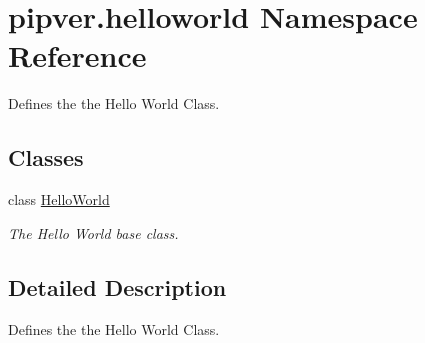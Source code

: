 \hypertarget{namespacepipver_1_1helloworld}{}\section{pipver.\+helloworld Namespace Reference}
\label{namespacepipver_1_1helloworld}


Defines the the Hello World Class.  


\subsection*{Classes}
\begin{DoxyCompactItemize}
\item 
class \hyperlink{classpipver_1_1helloworld_1_1HelloWorld}{Hello\+World}
\begin{DoxyCompactList}\small\item\em The Hello World base class. \end{DoxyCompactList}\end{DoxyCompactItemize}


\subsection{Detailed Description}
Defines the the Hello World Class. 

